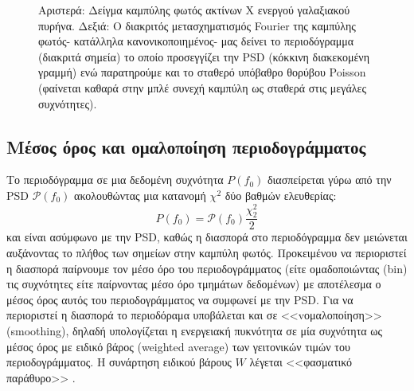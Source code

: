 \begin{figure}%
    \centering
    \qquad
     \caption{Αριστερά: Δείγμα καμπύλης φωτός ακτίνων Χ ενεργού γαλαξιακού πυρήνα. Δεξιά: Ο διακριτός μετασχηματισμός \textlatin{Fourier} της καμπύλης φωτός- κατάλληλα κανονικοποιημένος- μας δείνει το περιοδόγραμμα (διακριτά σημεία) το οποίο προσεγγίζει την \textlatin{PSD} (κόκκινη διακεκομένη γραμμή) ενώ παρατηρούμε και το σταθερό υπόβαθρο θορύβου \textlatin{Poisson} (φαίνεται καθαρά στην μπλέ συνεχή καμπύλη ως σταθερά στις μεγάλες συχνότητες)\cite{2010A&A...518A..28P}.} \label{fig:LCandPSD}
\end{figure}

\subsection{Μέσος όρος και ομαλοποίηση περιοδογράμματος}

Το περιοδόγραμμα σε μια δεδομένη συχνότητα $P(f_0)$ διασπείρεται γύρω από την \textlatin{PSD} $\mathcal{P}(f_0)$ ακολουθώντας μια κατανομή $\chi^2$ δύο βαθμών ελευθερίας:
\begin{equation}
    P(f_0) = \mathcal{P}(f_0)\dfrac{\chi^2_2}{2}
\end{equation}
και είναι ασύμφωνο με την \textlatin{PSD}, καθώς η διασπορά στο περιοδόγραμμα δεν μειώνεται αυξάνοντας το πλήθος των σημείων στην καμπύλη φωτός. Προκειμένου να περιοριστεί η διασπορά παίρνουμε τον μέσο όρο του περιοδογράμματος (είτε ομαδοποιώντας (\textlatin{bin}) τις συχνότητες είτε παίρνοντας μέσο όρο τμημάτων δεδομένων) με αποτέλεσμα ο μέσος όρος αυτός του περιοδογράμματος να συμφωνεί με την \textlatin{PSD}\cite{2003MNRAS.345.1271V}.
Για να περιοριστεί η διασπορά το περιοδόραμα υποβάλεται και σε <<vομαλοποίηση>> (\textlatin{smoothing}), δηλαδή υπολογίζεται η ενεργειακή πυκνότητα σε μία συχνότητα ως μέσος όρος με ειδικό βάρος (\textlatin{weighted average}) των γειτονικών τιμών του περιοδογράμματος. Η συνάρτηση ειδικού βάρους $W$ λέγεται <<φασματικό παράθυρο>> \cite{1993MNRAS.261..612P}.


